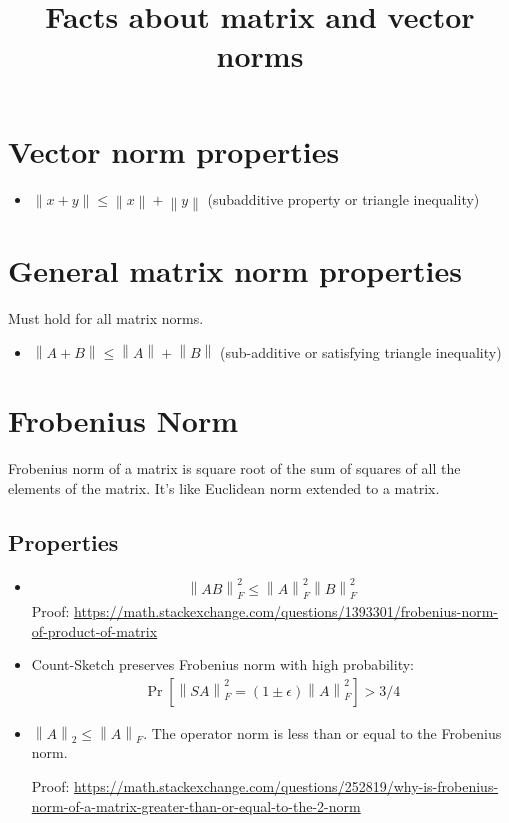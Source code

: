\documentclass[11pt]{article}
\title{Facts about matrix and vector norms}
\newcommand{\eq}[1]{\begin{align*}#1\end{align*}}
\newcommand{\norm}[1]{\left\lVert#1\right\rVert}
\begin{document}
\maketitle

\section{Vector norm properties}

\begin{itemize}
\item $\norm{x + y} \leq \norm{x} + \norm{y}$ (subadditive property or triangle inequality)
\end{itemize}

\section{General matrix norm properties}

Must hold for all matrix norms.

\begin{itemize}
\item $\norm{A + B} \leq \norm{A} + \norm{B}$ (sub-additive or satisfying triangle inequality)
\end{itemize}

\section{Frobenius Norm}

Frobenius norm of a matrix is square root of the sum of squares of all the elements of the matrix. It's like Euclidean norm extended to a matrix.

\subsection{Properties}

\begin{itemize}
\item
\eq{
\norm{AB}_F^2 \leq \norm{A}_F^2 \norm{B}_F^2
}
Proof: \url{https://math.stackexchange.com/questions/1393301/frobenius-norm-of-product-of-matrix}

\item Count-Sketch preserves Frobenius norm with high probability:
\eq{
\Pr[\norm{SA}_F^2 = (1 \pm \epsilon) \norm{A}_F^2] > 3/4
}

\item $\norm{A}_2 \leq \norm{A}_F$. The operator norm is less than or equal to the Frobenius norm.

Proof: \url{https://math.stackexchange.com/questions/252819/why-is-frobenius-norm-of-a-matrix-greater-than-or-equal-to-the-2-norm}
\end{itemize}
\end{document}
